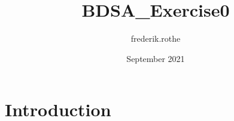 \documentclass{article}
\title{BDSA_Exercise0}
\author{frederik.rothe }
\date{September 2021}
\begin{document}
\maketitle

\section{Introduction}
\end{document}
